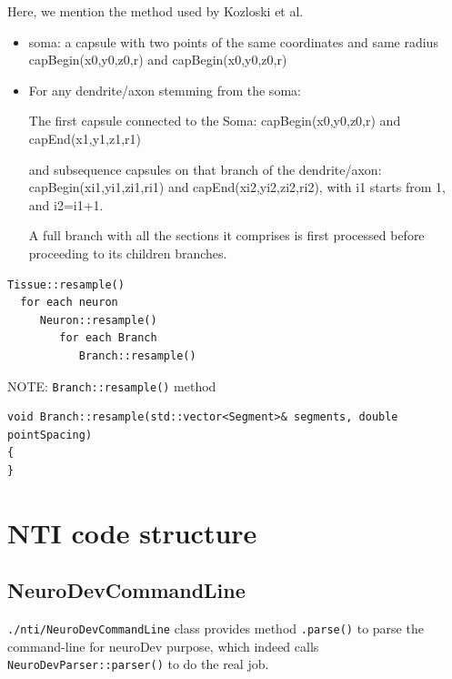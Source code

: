Here, we mention the method
used by Kozloski et al.
\begin{itemize}
  \item soma: a capsule with two points of the same coordinates and same radius
  capBegin(x0,y0,z0,r) and capBegin(x0,y0,z0,r)
  
  \item For any dendrite/axon stemming from the soma:
  
  The first capsule connected to the Soma:
  capBegin(x0,y0,z0,r) and capEnd(x1,y1,z1,r1)
  
  and subsequence capsules on that branch of the dendrite/axon:
  capBegin(xi1,yi1,zi1,ri1) and capEnd(xi2,yi2,zi2,ri2),
  with i1 starts from 1, and i2=i1+1.
  
  A full branch with all the sections it comprises is first processed before
  proceeding to its children branches.

\end{itemize}

\begin{verbatim}
Tissue::resample()
  for each neuron 
     Neuron::resample()
        for each Branch
           Branch::resample()
\end{verbatim}

NOTE: 
\verb!Branch::resample()! method 
\begin{verbatim}
void Branch::resample(std::vector<Segment>& segments, double pointSpacing)
{
}
\end{verbatim}




\section{NTI code structure}


\subsection{NeuroDevCommandLine}
\label{sec:parser-NeuroDevCommandLine}
\label{sec:NeuroDevCommandLine}

\verb!./nti/NeuroDevCommandLine! class
provides method \verb!.parse()! to parse the command-line for neuroDev purpose,
which indeed calls \verb!NeuroDevParser::parser()! to do the real job.



